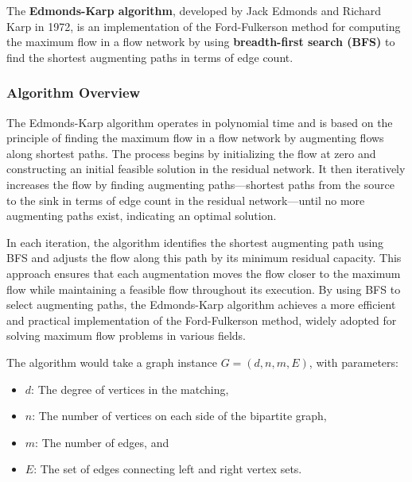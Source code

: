 
\label{ek algo}

The \textbf{Edmonds-Karp algorithm}, developed by Jack Edmonds and Richard Karp in 1972, is an implementation of the Ford-Fulkerson method for computing the maximum flow in a flow network by using \textbf{breadth-first search (BFS)} to find the shortest augmenting paths in terms of edge count. \cite{edmonds_karp_1972}

\subsubsection*{Algorithm Overview}
The Edmonds-Karp algorithm operates in polynomial time and is based on the principle of finding the maximum flow in a flow network by augmenting flows along shortest paths. The process begins by initializing the flow at zero and constructing an initial feasible solution in the residual network. It then iteratively increases the flow by finding augmenting paths—shortest paths from the source to the sink in terms of edge count in the residual network—until no more augmenting paths exist, indicating an optimal solution.

\noindent In each iteration, the algorithm identifies the shortest augmenting path using BFS and adjusts the flow along this path by its minimum residual capacity. This approach ensures that each augmentation moves the flow closer to the maximum flow while maintaining a feasible flow throughout its execution. By using BFS to select augmenting paths, the Edmonds-Karp algorithm achieves a more efficient and practical implementation of the Ford-Fulkerson method, widely adopted for solving maximum flow problems in various fields.

\noindent The algorithm would take a graph instance \( G = (d, n, m, E) \), with parameters:
        \begin{itemize}
            \item \( d \): The degree of vertices in the matching,
            \item \( n \): The number of vertices on each side of the bipartite graph,
            \item \( m \): The number of edges, and
            \item \( E \): The set of edges connecting left and right vertex sets.
        \end{itemize}
        

